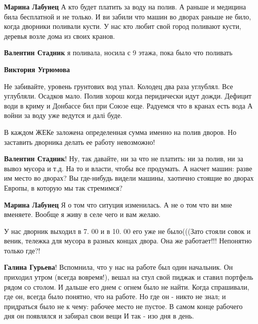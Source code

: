 \begin{itemize}
\begin{itemize} %
\textbf{Марина Лабунец} А кто будет платить за воду на полив. А раньше и медицина била бесплатной и не только. И ви забили что машин во дворах раньше не било, когда дворники поливали кусти. У нас кто любит свой город поливают кусти, деревья возле дома из своих кранов.

\begin{itemize} %
\textbf{Валентин Стадник} я поливала, носила с 9 этажа, пока было что поливать

\textbf{Виктория Угрюмова} 

Не забивайте, уровень грунтових вод упал. Колодец два раза углублял. Все
углубляли. Осадков мало. Полив хорош когда перидически идут дожди. Дефицит води в
криму и Донбассе бил при Союзе еще. Радуемся что в кранах есть вода А войни за
воду уже ведутся и далі буде.

\end{itemize} %

В каждом ЖЕКе заложена определенная сумма именно на полив дворов. Но заставить дворника делать ее работу невозможно!

\textbf{Валентин Стадник}! Ну, так давайте, ни за что не платить: ни за полив, ни за вывоз мусора и т.д. На то и власти, чтобы все продумать. А насчет машин: разве им место во дворах? Вы где-нибудь видели машины, хаотично стоящие во дворах Европы, в которую мы так стремимся?

\begin{itemize} %
\textbf{Марина Лабунец} Я о том что ситуция изменилась. А не о том что ви мне вменяете. Вообще я живу в селе чего и вам желаю.
\end{itemize} %


У нас дворник выходил в 7. 00 и в 10. 00 его уже не было(((Зато стояли совок и
веник, тележка для мусора в разных концах двора. Она же работает!!! Непонятно
только где?!


\textbf{Галина Гурьева}! Вспомнила, что у нас на работе был один начальник. Он приходил
утром (всегда вовремя!), вешал на стул свой пиджак и ставил портфель рядом со
столом. И дальше его днем с огнем было не найти. Когда спрашивали, где он,
всегда было понятно, что на работе. Но где он - никто не знал; и придраться
было не к чему: рабочее место не пустое. В самом конце рабочего дня он
появлялся и забирал свои вещи И так - изо дня в день.



\end{itemize}
\end{itemize}
